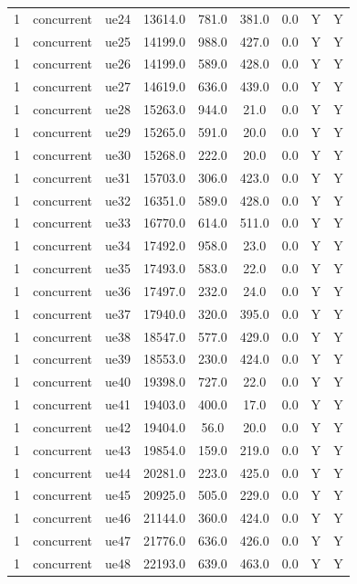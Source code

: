 \begin{table}[ht]
\begin{tabular}{|c|c|c|c|c|c|c|c|c|}
1 & concurrent & ue24 & 13614.0 & 781.0 & 381.0 & 0.0 & Y & Y \\
1 & concurrent & ue25 & 14199.0 & 988.0 & 427.0 & 0.0 & Y & Y \\
1 & concurrent & ue26 & 14199.0 & 589.0 & 428.0 & 0.0 & Y & Y \\
1 & concurrent & ue27 & 14619.0 & 636.0 & 439.0 & 0.0 & Y & Y \\
1 & concurrent & ue28 & 15263.0 & 944.0 & 21.0 & 0.0 & Y & Y \\
1 & concurrent & ue29 & 15265.0 & 591.0 & 20.0 & 0.0 & Y & Y \\
1 & concurrent & ue30 & 15268.0 & 222.0 & 20.0 & 0.0 & Y & Y \\
1 & concurrent & ue31 & 15703.0 & 306.0 & 423.0 & 0.0 & Y & Y \\
1 & concurrent & ue32 & 16351.0 & 589.0 & 428.0 & 0.0 & Y & Y \\
1 & concurrent & ue33 & 16770.0 & 614.0 & 511.0 & 0.0 & Y & Y \\
1 & concurrent & ue34 & 17492.0 & 958.0 & 23.0 & 0.0 & Y & Y \\
1 & concurrent & ue35 & 17493.0 & 583.0 & 22.0 & 0.0 & Y & Y \\
1 & concurrent & ue36 & 17497.0 & 232.0 & 24.0 & 0.0 & Y & Y \\
1 & concurrent & ue37 & 17940.0 & 320.0 & 395.0 & 0.0 & Y & Y \\
1 & concurrent & ue38 & 18547.0 & 577.0 & 429.0 & 0.0 & Y & Y \\
1 & concurrent & ue39 & 18553.0 & 230.0 & 424.0 & 0.0 & Y & Y \\
1 & concurrent & ue40 & 19398.0 & 727.0 & 22.0 & 0.0 & Y & Y \\
1 & concurrent & ue41 & 19403.0 & 400.0 & 17.0 & 0.0 & Y & Y \\
1 & concurrent & ue42 & 19404.0 & 56.0 & 20.0 & 0.0 & Y & Y \\
1 & concurrent & ue43 & 19854.0 & 159.0 & 219.0 & 0.0 & Y & Y \\
1 & concurrent & ue44 & 20281.0 & 223.0 & 425.0 & 0.0 & Y & Y \\
1 & concurrent & ue45 & 20925.0 & 505.0 & 229.0 & 0.0 & Y & Y \\
1 & concurrent & ue46 & 21144.0 & 360.0 & 424.0 & 0.0 & Y & Y \\
1 & concurrent & ue47 & 21776.0 & 636.0 & 426.0 & 0.0 & Y & Y \\
1 & concurrent & ue48 & 22193.0 & 639.0 & 463.0 & 0.0 & Y & Y \\

\end{tabular}
\end{table}
